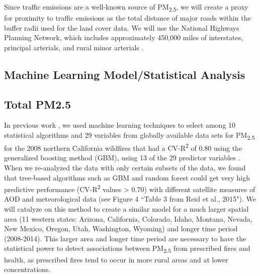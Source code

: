 \documentclass[authoryear]{elsarticle}
\begin{document}
Since traffic emissions are a well-known source of PM\textsubscript{2.5}, we will create a proxy for proximity to traffic emissions as the total distance of major roads within the buffer radii used for the land cover data. We will use the National Highways Planning Network, which includes approximately 450,000 miles of interstates, principal arterials, and rural minor arterials \citep{NHP2017}.


\subsection{Machine Learning Model/Statistical Analysis} %

	\subsection{Total PM2.5} %
	
	In previous work \citep{Reid2015}, we used machine learning techniques to select among 10 statistical algorithms and 29 variables from globally available data sets for PM\textsubscript{2.5} for the 2008 northern California wildfires that had a CV-R\textsuperscript{2} of 0.80 using the generalized boosting method (GBM), using 13 of the 29 predictor variables \citep{Reid2015}. When we re-analyzed the data with only certain subsets of the data, we found that tree-based algorithms such as GBM and random forest could get very high predictive performance (CV-R\textsuperscript{2} values > 0.70) with different satellite measures of AOD and meteorological data (see Figure 4 ``Table 3 from Reid et al., 2015"). 
We will catalyze on this method to create a similar model for a much larger spatial area (11 western states: Arizona, California, Colorado, Idaho, Montana, Nevada, New Mexico, Oregon, Utah, Washington, Wyoming) and longer time period (2008-2014). This larger area and longer time period are necessary to have the statistical power to detect associations between PM\textsubscript{2.5} from prescribed fires and health, as prescribed fires tend to occur in more rural areas and at lower concentrations.
\end{document}
